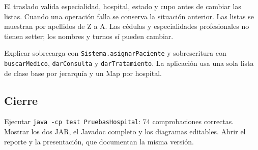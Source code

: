 \documentclass[12pt]{article}
\begin{document}
El traslado valida especialidad, hospital, estado y cupo antes de cambiar las listas. Cuando una operación falla se conserva la situación anterior. Las listas se muestran por apellidos de Z a A. Las cédulas y especialidades profesionales no tienen setter; los nombres y turnos sí pueden cambiar.

Explicar sobrecarga con \texttt{Sistema.asignarPaciente} y sobrescritura con \texttt{buscarMedico}, \texttt{darConsulta} y \texttt{darTratamiento}. La aplicación usa una sola lista de clase base por jerarquía y un Map por hospital.

\subsection*{Cierre}
Ejecutar \texttt{java -cp test PruebasHospital}: 74 comprobaciones correctas. Mostrar los dos JAR, el Javadoc completo y los diagramas editables. Abrir el reporte y la presentación, que documentan la misma versión.
\end{document}
